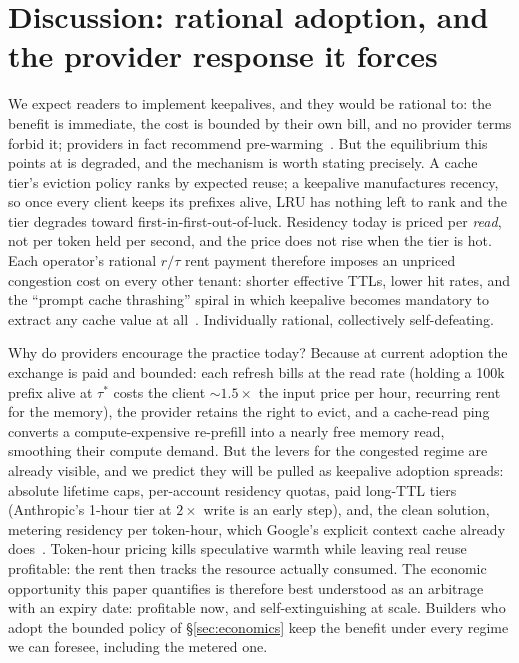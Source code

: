 \documentclass[10pt,twocolumn]{article}
\begin{document}
\section{Discussion: rational adoption, and the provider response it forces}
\label{sec:equilibrium}
We expect readers to implement keepalives, and they would be rational to: the
benefit is immediate, the cost is bounded by their own bill, and no provider
terms forbid it; providers in fact recommend pre-warming~\cite{anthropic-prewarm}.
But the equilibrium this points at is degraded, and the mechanism is worth
stating precisely. A cache tier's eviction policy ranks by expected reuse; a
keepalive manufactures recency, so once every client keeps its prefixes alive,
LRU has nothing left to rank and the tier degrades toward
first-in-first-out-of-luck. Residency today is priced per \emph{read}, not per
token held per second, and the price does not rise when the tier is hot. Each
operator's rational $r/\tau$ rent payment therefore imposes an unpriced
congestion cost on every other tenant: shorter effective TTLs, lower hit rates,
and the ``prompt cache thrashing'' spiral in which keepalive becomes mandatory
to extract any cache value at all~\cite{cache-thrashing-blog}. Individually
rational, collectively self-defeating.

Why do providers encourage the practice today? Because at current adoption the
exchange is paid and bounded: each refresh bills at the read rate (holding a
100k prefix alive at $\tau^{\ast}$ costs the client ${\sim}1.5\times$ the input
price per hour, recurring rent for the memory), the provider retains the right
to evict, and a cache-read ping converts a compute-expensive re-prefill into a
nearly free memory read, smoothing their compute demand. But the levers for the
congested regime are already visible, and we predict they will be pulled as
keepalive adoption spreads: absolute lifetime caps, per-account residency
quotas, paid long-TTL tiers (Anthropic's 1-hour tier at $2\times$ write is an
early step), and, the clean solution, metering residency per token-hour, which
Google's explicit context cache already does~\cite{google-caching}. Token-hour
pricing kills speculative warmth while leaving real reuse profitable: the rent
then tracks the resource actually consumed. The economic opportunity this paper
quantifies is therefore best understood as an arbitrage with an expiry date:
profitable now, and self-extinguishing at scale. Builders who adopt the bounded
policy of \S\ref{sec:economics} keep the benefit under every regime we can
foresee, including the metered one.
\end{document}
